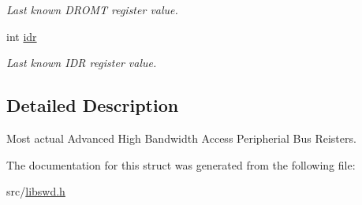 \begin{DoxyCompactItemize}
\begin{DoxyCompactList}\small\item\em Last known DROMT register value. \item\end{DoxyCompactList}\item 
\hypertarget{structswd__ahbap__t_abdf7f34a1a4948fbc6bd4b60b798db2c}{
int \hyperlink{structswd__ahbap__t_abdf7f34a1a4948fbc6bd4b60b798db2c}{idr}}
\label{structswd__ahbap__t_abdf7f34a1a4948fbc6bd4b60b798db2c}

\begin{DoxyCompactList}\small\item\em Last known IDR register value. \item\end{DoxyCompactList}\end{DoxyCompactItemize}


\subsection{Detailed Description}
Most actual Advanced High Bandwidth Access Peripherial Bus Reisters. 

The documentation for this struct was generated from the following file:\begin{DoxyCompactItemize}
\item 
src/\hyperlink{libswd_8h}{libswd.h}\end{DoxyCompactItemize}
